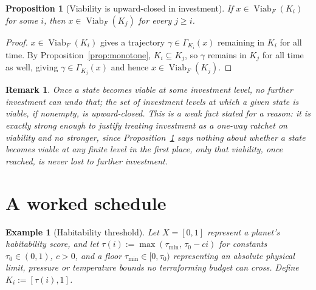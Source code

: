 \documentclass[11pt]{report}
\newtheorem{proposition}{Proposition}[chapter]
\newtheorem{remark}{Remark}[chapter]
\newtheorem{example}{Example}[chapter]
\begin{document}
\begin{proposition}[Viability is upward-closed in investment]
\label{prop:viab-upward}
If $x \in \operatorname{Viab}_F(K_i)$ for some $i$, then $x \in
\operatorname{Viab}_F(K_j)$ for every $j \geq i$.
\end{proposition}
\begin{proof}
$x \in \operatorname{Viab}_F(K_i)$ gives a trajectory $\gamma \in
\Gamma_{K_i}(x)$ remaining in $K_i$ for all time. By
Proposition~\ref{prop:monotone}, $K_i \subseteq K_j$, so $\gamma$
remains in $K_j$ for all time as well, giving $\gamma \in
\Gamma_{K_j}(x)$ and hence $x \in \operatorname{Viab}_F(K_j)$.
\end{proof}

\begin{remark}
Once a state becomes viable at some investment level, no further
investment can undo that; the set of investment levels at which a
given state is viable, if nonempty, is upward-closed. This is a weak
fact stated for a reason: it is exactly strong enough to justify
treating investment as a one-way ratchet on viability and no stronger,
since Proposition~\ref{prop:viab-upward} says nothing about whether a
state \emph{becomes} viable at any finite level in the first place,
only that viability, once reached, is never lost to further
investment.
\end{remark}

\section*{A worked schedule}

\begin{example}[Habitability threshold]
Let $X = [0,1]$ represent a planet's habitability score, and let
$\tau(i) := \max(\tau_{\min},\, \tau_0 - c i)$ for constants $\tau_0
\in (0,1)$, $c > 0$, and a floor $\tau_{\min} \in [0, \tau_0)$
representing an absolute physical limit, pressure or temperature
bounds no terraforming budget can cross. Define
$K_i := [\tau(i), 1]$.
\end{example}
\end{document}
